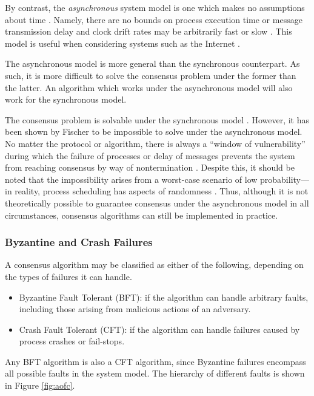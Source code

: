 \documentclass[12pt, a4paper]{article}
\begin{document}
By contrast, the \textit{asynchronous} system model is one which makes no
assumptions about time \cite{coulouris2005distributed, hadzilacos1994modular}.
Namely, there are no bounds on process execution time or message transmission
delay and clock drift rates may be arbitrarily fast or slow
\cite{coulouris2005distributed}. This model is useful when considering systems
such as the Internet \cite{coulouris2005distributed}.

The asynchronous model is more general than the synchronous counterpart. As
such, it is more difficult to solve the consensus problem under the former than
the latter. An algorithm which works under the asynchronous model will also work
for the synchronous model.

The consensus problem is solvable under the synchronous model
\cite{fischer1985impossibility, kshemkalyani_singhal_2008}. However, it has been
shown by Fischer \cite{fischer1985impossibility} to be impossible to solve under
the asynchronous model. No matter the protocol or algorithm, there is always a
``window of vulnerability'' during which the failure of processes or delay of
messages prevents the system from reaching consensus by way of nontermination
\cite{fischer1985impossibility}. Despite this, it should be noted that the
impossibility arises from a worst-case scenario of low probability---in reality,
process scheduling has aspects of randomness \cite{aguilera2010stumbling}. Thus,
although it is not theoretically possible to guarantee consensus under the
asynchronous model in all circumstances, consensus algorithms can still be
implemented in practice.

\subsubsection{Byzantine and Crash Failures}

A consensus algorithm may be classified as either of the following, depending on
the types of failures it can handle.

\begin{itemize}
	\item Byzantine Fault Tolerant (BFT): if the algorithm can handle arbitrary
    faults, including those arising from malicious actions of an adversary.
	\item Crash Fault Tolerant (CFT): if the algorithm can handle failures caused
    by process crashes or fail-stops.
\end{itemize}

Any BFT algorithm is also a CFT algorithm, since Byzantine failures encompass
all possible faults in the system model. The hierarchy of different faults
\cite{barborak1993consensus} is shown in Figure \ref{fig:aofc}.
\end{document}

